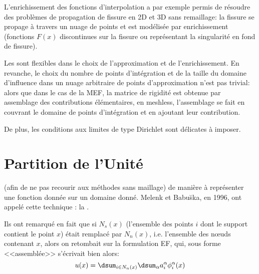 L'enrichissement des fonctions d'interpolation a par exemple permis de résoudre des problèmes 
de propagation de fissure en 2D et 3D sans remaillage: la fissure se propage à travers un nuage de points 
et est modélisée par enrichissement (fonctions $F(x)$ discontinues sur la fissure ou représentant la 
singularité en fond de fissure).

\medskip
Les  
sont flexibles dans le choix de  l'approximation et de l'enrichissement. 
En revanche, le choix du nombre de points d'intégration et de la taille du
domaine d'influence dans un nuage arbitraire de points d'approximation n'est pas trivial:
alors que dans le cas de la MEF, la matrice de rigidité est obtenue par assemblage des contributions
élémentaires, en meshless, l'assemblage se fait en couvrant le domaine de points d'intégration et 
en ajoutant leur contribution.

De plus, les conditions aux limites de type Dirichlet sont délicates à imposer.



\medskip
\section{Partition de l'Unité}\label{Sec-partition}

 (afin de ne pas recourir aux méthodes 
sans maillage) de manière à représenter une fonction donnée sur un domaine donné. 
Melenk et 
Babu\u{s}ka,
en 1996, ont appelé cette technique : 
la . 

Ils ont remarqué en fait que si $N_s(x)$ (l'ensemble des points $i$ dont le support contient le point $x$)
était remplacé par $N_n(x)$, i.e. l'ensemble des nœuds contenant $x$, alors on retombait
sur la formulation EF, qui, sous forme <<assemblée>> s'écrivait bien alors:
\begin{equation}
u(x) = \dsum_{i\in N_n(x)}\dsum_{\alpha} a_i^\alpha \phi_i^\alpha(x)
\end{equation}


